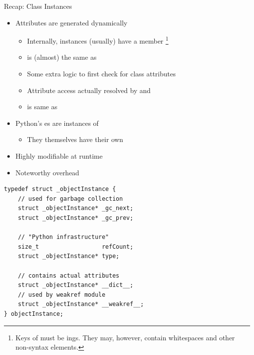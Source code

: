 
\begin{frame}{Recap: Class Instances}
%
\begin{itemize}
\item Attributes are generated dynamically
	\begin{itemize}
	\item Internally,  instances (usually) have a member \footnote{%
		Keys of  must be ings. They may, however, contain whitespaces and other non-syntax elements.}
	\item {} is (almost) the same as 
	\item Some extra logic to first check for class attributes
	\item Attribute access actually resolved by  and 
	\item {} is same as  
	\end{itemize}
\item Python's es are instances of 
	\begin{itemize}
	\item They themselves have their own 
	\end{itemize}
\item[\Thus] Highly modifiable at runtime
\item[\Thus] Noteworthy overhead
\end{itemize}
%
%
\end{frame}


\begin{frame}[fragile]
%
\begin{codebox}
\begin{verbatim}
typedef struct _objectInstance {
    // used for garbage collection
    struct _objectInstance* _gc_next;    
    struct _objectInstance* _gc_prev;
    
    // "Python infrastructure"
    size_t                  refCount;
    struct _objectInstance* type;
    
    // contains actual attributes
    struct _objectInstance* __dict__;
    // used by weakref module
    struct _objectInstance* __weakref__;
} objectInstance;
\end{verbatim}
\end{codebox}
%
\end{frame}

